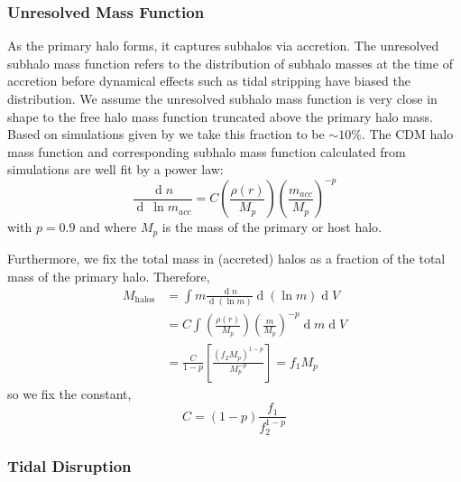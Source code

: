 \documentclass[usenatbib]{mnras}
\renewcommand{\d}[1]{\! \mathrm{d}#1 \:}
\newcommand{\deriv}[2]{\frac{\d{#1}}{\d{#2}}}
\renewcommand{\d}[1]{\ensuremath{\operatorname{d}\!{#1}}}
\begin{document}
\subsubsection{Unresolved Mass Function}

	As the primary halo forms, it captures subhalos via accretion. The unresolved subhalo mass function refers to the distribution of subhalo masses at the time of accretion before dynamical effects such as tidal stripping have biased the distribution. We assume the unresolved subhalo mass function is very close in shape to the free halo mass function truncated above the primary halo mass. Based on simulations given by \citet{dark_wave} we take this fraction to be $\sim 10\%$. The CDM halo mass function and corresponding subhalo mass function calculated from simulations \citep{pop_of_subhalos, unified_model} are well fit by a power law: 
\begin{equation}
\frac{\d{n}}{\d{\: \ln{m_{acc}}}} = C \left(\frac{\rho(r)}{M_p}\right) \left(\frac{m_{acc}}{M_p} \right)^{-p} 
\end{equation}
with $p = 0.9$ and where $M_p$ is the mass of the primary or host halo.
\par
Furthermore, we fix the total mass in (accreted) halos as a fraction of the total mass of the primary halo. Therefore,
\begin{subequations}
\begin{align}
M_{\mathrm{halos}} & = \int m \deriv{n}{(\ln{m})} \d{(\ln{m})} \d{V}
\\
& = C \int \left(\frac{\rho(r)}{M_p}\right) \left(\frac{m}{M_p} \right)^{-p} \d{m} \d{V} 
\\
& = \frac{C}{1-p} \left[ \frac{(f_2 M_p)^{1-p}}{M_p^{-p}} \right] = f_1 M_p 
\end{align} 
\end{subequations}
so we fix the constant,
\begin{equation}
C = (1 - p)\frac{f_1}{f_2^{1-p}} 
\end{equation}

\subsubsection{Tidal Disruption} 
\end{document}
